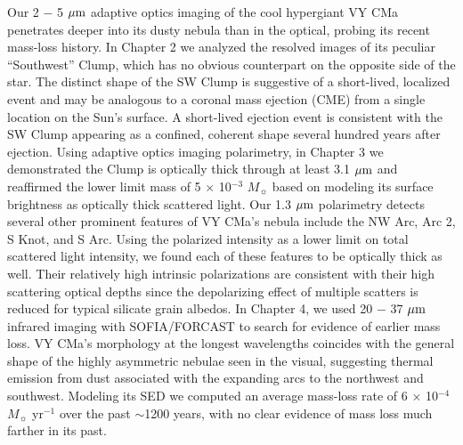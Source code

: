 Our 2 $-$ 5 $\mbox{$\mu$m}$ adaptive optics imaging of the cool hypergiant VY CMa penetrates deeper into its dusty nebula than in the optical, probing its recent mass-loss history.  In Chapter 2 we analyzed the resolved images of its peculiar ``Southwest'' Clump, which has no obvious counterpart on the opposite side of the star.   The distinct shape of the SW Clump is suggestive of a short-lived, localized event and may be analogous to a coronal mass ejection (CME) from a single location on the Sun's surface.  A short-lived ejection event is consistent with the SW Clump appearing as a confined, coherent shape several hundred years after ejection.  Using adaptive optics imaging polarimetry, in Chapter 3 we demonstrated the Clump is optically thick through at least 3.1 $\mbox{$\mu$m}$ and reaffirmed the lower limit mass of 5 $\times$ 10$^{-3}$ $M_{\sun}$ based on modeling its surface brightness as optically thick scattered light.  Our 1.3 $\mbox{$\mu$m}$ polarimetry detects several other prominent features of VY CMa's nebula include the NW Arc, Arc 2, S Knot, and S Arc.  Using the polarized intensity as a lower limit on total scattered light intensity, we found each of these features to be optically thick as well.  Their relatively high intrinsic polarizations are consistent with their high scattering optical depths since the depolarizing effect of multiple scatters is reduced for typical silicate grain albedos.  In Chapter 4, we used 20 $-$ 37 $
\mbox{$\mu$m}$ infrared imaging with SOFIA/FORCAST to search for evidence of earlier mass loss.  VY CMa's morphology at the longest wavelengths coincides with the general shape of the highly asymmetric nebulae seen in the visual, suggesting thermal emission from dust associated with the expanding arcs to the northwest and southwest.  Modeling its SED we computed an average mass-loss rate of 6 $\times$ 10$^{-4}$ $M_{\sun}$ yr$^{-1}$ over the past $\sim$1200 years, with no clear evidence of mass loss much farther in its past.

